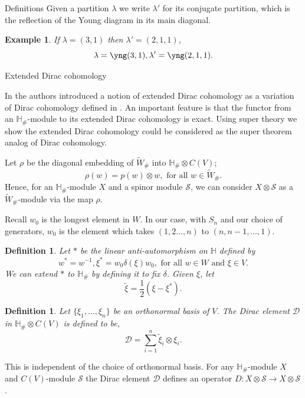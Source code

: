 \documentclass[a4paper,10pt]{amsart}
\newtheorem{definition}[theorem]{Definition}
\newtheorem{example}[theorem]{Example}
\begin{document}
\begin{section}{Definitions}
 Given a partition $\lambda$ we write $\lambda'$ for its conjugate partition, which is the reflection of the Young diagram in its main diagonal. 
\begin{example} If $\lambda = (3,1)$ then $\lambda' = (2,1,1)$,
$$\lambda = \yng(3,1), \lambda' = \yng(2,1,1).$$ \end{example}%


 
 
\end{section}

\begin{section}{Extended Dirac cohomology} 

In \cite{CH15} the authors introduced  a notion of extended Dirac cohomology as a variation of Dirac cohomology defined in \cite{BCT12}. An important feature is that the functor from an $\mathbb{H}_\#$-module to its extended Dirac cohomology is exact. Using super theory we show the extended Dirac cohomology could be considered as the super theorem analog of Dirac cohomology.



Let $\rho$ be the diagonal embedding of $\tilde{W}_\#$ into $\mathbb{H}_\#\otimes C(V)$;
$$\rho (w) = p(w) \otimes w, \text{ for all } w \in \tilde{W}_\#.$$
Hence, for an $\mathbb{H}_\#$-module $X$ and a spinor module $\mathcal{S}$, we can consider $X\otimes \mathcal{S}$ as a $\tilde{W}_\#$-module via the map $\rho$.  

Recall $w_0$ is the longest element in $W$. In our case, with $S_n$ and our choice of generators, $w_0$ is the element which takes $(1,2\ldots ,n)$ to $(n,n-1,\ldots ,1)$.
\begin{definition}Let $*$ be the linear anti-automorphism on $\mathbb{H}$ defined by 
$$w^* = w^{-1}, \xi^* = w_0 \delta(\xi)w_0, \text{ for all } w\in W \text{ and } \xi \in V.$$
We can extend $*$ to $\mathbb{H}_\#$ by defining it to fix $\delta$. Given $\xi$, let 
$$\tilde{\xi} = \frac{1}{2}(\xi - \xi^*).$$  \end{definition}


\begin{definition} Let $\{\xi_1,\ldots ,\xi_n\}$ be an orthonormal basis  of $V$. The Dirac element $\mathcal{D}$ in $\mathbb{H}_\#\otimes C(V)$ is defined to be,
$$\mathcal{D} = \sum_{i=1}^{n} \tilde{\xi}_i \otimes \xi_i.$$
\end{definition} 
This is independent of the choice of orthonormal basis. For any $\mathbb{H}_\#$-module $X$ and $C(V)$-module $\mathcal{S}$ the Dirac element $\mathcal{D}$ defines an operator $D: X\otimes \mathcal{S} \to X\otimes \mathcal{S}$. 


\end{section}
\end{document}
